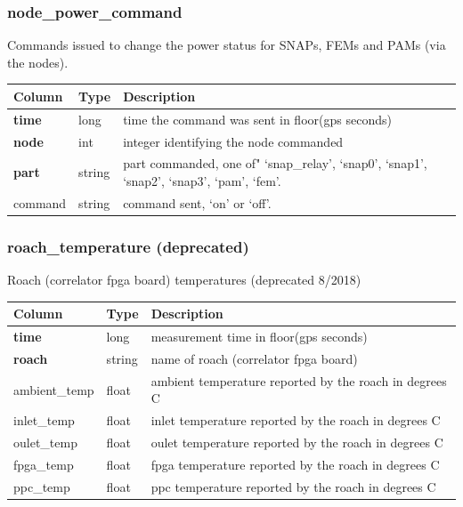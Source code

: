 \documentclass{article}
\begin{document}
\subsubsection{node\_power\_command}
Commands issued to change the power status for SNAPs, FEMs and PAMs (via the nodes).
\begin{center}
 \begin{tabular}{| p{4cm} | p{2cm} | p{10cm} |}
\hline
 {\bf Column} & {\bf Type}  & {\bf Description} \\ [0.5ex]  \hline\hline
\textbf{time} & long & time the command was sent in floor(gps seconds)\\ \hline
\textbf{node} & int & integer identifying the node commanded \\ \hline
\textbf{part} & string & part commanded, one of" `snap\_relay', `snap0', `snap1', `snap2', `snap3', `pam', `fem'. \\ \hline
command & string & command sent, `on' or `off'. \\\hline
\end{tabular}
\end{center}


\subsubsection{roach\_temperature (deprecated)}
Roach (correlator fpga board) temperatures (deprecated 8/2018)
\begin{center}
 \begin{tabular}{| p{4cm} | p{2cm} | p{10cm} |}
\hline
 {\bf Column} & {\bf Type}  & {\bf Description} \\ [0.5ex]  \hline\hline
\textbf{time} & long & measurement time in floor(gps seconds)\\ \hline
\textbf{roach} & string & name of roach (correlator fpga board) \\ \hline
ambient\_temp & float & ambient temperature reported by the roach in degrees C \\\hline
inlet\_temp & float & inlet temperature reported by the roach in degrees C \\\hline
oulet\_temp & float & oulet temperature reported by the roach in degrees C \\\hline
fpga\_temp & float & fpga temperature reported by the roach in degrees C \\\hline
ppc\_temp & float & ppc temperature reported by the roach in degrees C \\\hline
\end{tabular}
\end{center}
\end{document}
